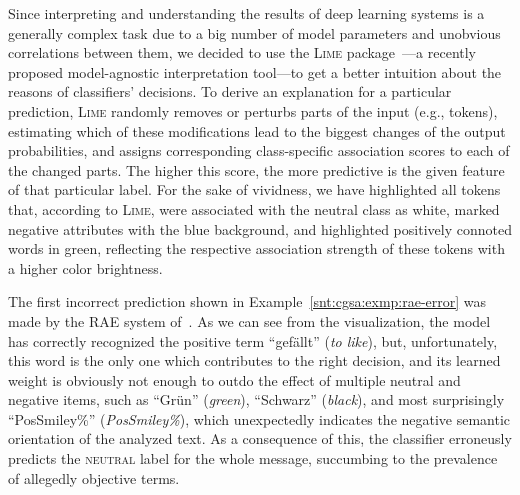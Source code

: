 Since interpreting and understanding the results of deep learning
systems is a generally complex task due to a big number of model
parameters and unobvious correlations between them, we decided to use
the \textsc{Lime} package~\cite{Ribeiro:16}---a recently proposed
model-agnostic interpretation tool---to get a better intuition about
the reasons of classifiers' decisions.  To derive an explanation for a
particular prediction, \textsc{Lime} randomly removes or perturbs
parts of the input (e.g., tokens), estimating which of these
modifications lead to the biggest changes of the output probabilities,
and assigns corresponding class-specific association scores to each of
the changed parts.  The higher this score, the more predictive is the
given feature of that particular label.  For the sake of vividness, we
have highlighted all tokens that, according to \textsc{Lime}, were
associated with the neutral class as white, marked negative attributes
with the \colorbox{blue!30}{blue} background, and highlighted
positively connoted words in \colorbox{green!30}{green}, reflecting
the respective association strength of these tokens with a higher
color brightness.

The first incorrect prediction shown in
Example~\ref{snt:cgsa:exmp:rae-error} was made by the RAE system
of~\citet{Socher:11}.  As we can see from the visualization, the model
has correctly recognized the positive term ``gef\"allt'' (\emph{to
  like}), but, unfortunately, this word is the only one which
contributes to the right decision, and its learned weight is obviously
not enough to outdo the effect of multiple neutral and negative items,
such as ``Gr\"un'' (\emph{green}), ``Schwarz'' (\emph{black}), and
most surprisingly ``PosSmiley\%'' (\emph{PosSmiley\%}), which
unexpectedly indicates the negative semantic orientation of the
analyzed text.  As a consequence of this, the classifier erroneusly
predicts the \textsc{neutral} label for the whole message, succumbing
to the prevalence of allegedly objective terms.

